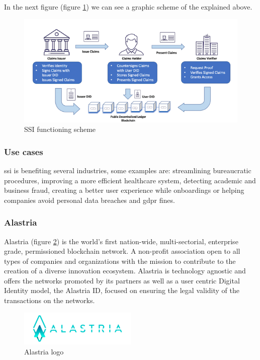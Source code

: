\documentclass[a4paper, 12pt]{article} %
\begin{document}
                    In the next figure (figure \ref{fig:ssi-scheme}) we can see a graphic scheme of the explained above.
                    \begin{figure}[h]
                        \centering
                        \includegraphics[width=1.0\textwidth]{how-to-ssi.png}
                        \caption{SSI functioning scheme}
                        \label{fig:ssi-scheme}
                    \end{figure}

            \subsubsection{Use cases}
                \acrlong{ssi} is benefiting several industries\cite{ssi-guide}, some examples are: streamlining bureaucratic procedures, improving a more efficient healthcare system, detecting academic and business fraud, creating a better user experience while onboardings or helping companies avoid personal data breaches and \acrshort{gdpr}\cite{gdpr} fines.

            \subsubsection{Alastria}
                Alastria (figure \ref{fig:alastria_logo}) is the world’s first nation-wide, multi-sectorial, enterprise grade, permissioned blockchain network. A non-profit association open to all types of companies and organizations with the mission to contribute to the creation of a diverse innovation ecosystem. Alastria is technology agnostic and offers the networks promoted by its partners as well as a user centric Digital Identity model, the Alastria ID, focused on ensuring the legal validity of the transactions on the networks.
                \begin{figure}[h]
                    \centering
                    \includegraphics[width=0.5\textwidth]{alastria-logo.png}
                    \caption{Alastria logo}
                    \label{fig:alastria_logo}
                \end{figure}
\end{document}

